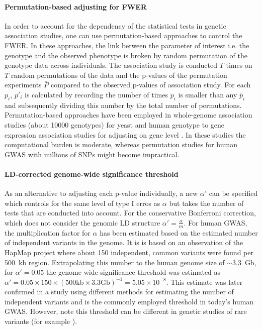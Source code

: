 \paragraph{Permutation-based adjusting for FWER}
In order to account for the dependency of the statistical tests in genetic association studies, one can use permutation-based approaches to control the FWER. In these approaches, the link between the parameter of interest i.e. the genotype and the observed phenotype is broken by random permutation of the genotype data across individuals.  The association study is conducted \(T\) times on \(T\)  random permutations of the data and the p-values of the permutation experiments \(\bar{P}\) compared to the observed p-values of association study. For each \(p_i\),   \(p'_i\)  is calculated by recording the number of times \(p_i\) is smaller than any \(\bar{p}_i\) and subsequently dividing this number by the total number of permutations. Permutation-based approaches have been employed in whole-genome association studies (about \num{10000} genotypes) for yeast \citep{Brem2002,Ehrenreich2010,Bloom2013} and human genotype to gene expression association studies for adjusting on gene level \citep{1000Genomes2015}. In these studies the computational burden is moderate, whereas permutation studies for human GWAS with millions of SNPs might become impractical. 

\paragraph{LD-corrected genome-wide significance threshold}
As an alternative to adjusting each p-value individually, a new \(\alpha '\) can be specified which controls for the same level of type I erros as \(\alpha\) but takes the number of tests that are conducted into account. For the conservative Bonferroni correction, which does not consider the genomic LD structure \(\alpha ' = \frac{\alpha}{m}\). 
For human GWAS, the multiplication factor for \(\alpha \) has been estimated based on the estimated number of independent variants in the genome.  It is is based on an observation of the HapMap project \citep{HapMap2005} where about \num{150} independent, common variants were found per \num{500}~kb region.  Extrapolating this number to the human genome size of \(\sim 3.3\)~Gb, for \(\alpha ' =0.05\) the genome-wide significance threshold was estimated as  \(\alpha '= 0.05 \times 150 \times \left(500\text{kb} \times 3.3 \text{Gb}\right)^{-1}= 5.05 \times 10^{-8}\). This estimate was later confirmed in a study using different methods for estimating the number of independent variants \citep{Fadista2016} and is the commonly employed threshold in today's human GWAS. However, note this threshold can be different in genetic studies of rare variants (for example \citep{Xu2014}).

